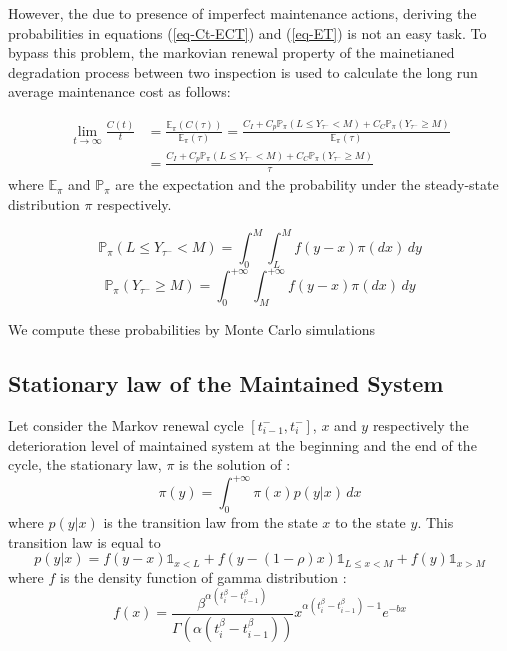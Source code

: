 \documentclass[review]{elsarticle}
\begin{document}
However, the due to presence of imperfect maintenance actions, deriving the probabilities in equations (\ref{eq-Ct-ECT}) and (\ref{eq-ET}) is not an easy task. To bypass this problem, the markovian renewal property of the mainetianed degradation process between two inspection is used to calculate the long run average maintenance cost as follows:

\begin{align}\label{eq-Ct-Epi}
\lim_{t\to\infty}\frac{C(t)}{t}&=\frac{{\mathds E}_{\pi}(C(\tau))}{{\mathds E}_{\pi}(\tau)}=\frac{ C_I +  C_p{\mathds P}_{\pi}(L \leq Y_{ \tau^-}< M) +C_C {\mathds P}_{\pi}( Y_{ \tau^-}\geq M)
}{{\mathds E}_{\pi}(\tau)}\nonumber\\
 & = \frac{ C_I +  C_p{\mathds P}_{\pi}(L \leq Y_{ \tau^-}< M) +C_C {\mathds P}_{\pi}( Y_{ \tau^-}\geq M)}{\tau}
\end{align}
where ${\mathds E}_{\pi}$ and ${\mathds P}_{\pi}$  are the expectation and the probability under the steady-state distribution $\pi$ respectively.

\begin{equation}\label{eq-Pi_1}
{\mathds P}_{\pi}(L \leq Y_{ \tau^-}< M)=\int_{0}^M \int_L^M f(y-x)\pi(dx)\,dy 
\end{equation}
\begin{equation}\label{eq-Pi_2}
{\mathds P}_{\pi}( Y_{ \tau^-}\geq M)=\int_{0}^{+\infty} \int_M^{+\infty} f(y-x)\pi(dx)\,dy 
\end{equation}

We compute these probabilities by Monte Carlo simulations







\subsection{Stationary law of the Maintained System}
Let consider the Markov renewal cycle $[t_{i-1}^-,t_i^-]$, $x$ and $y$ respectively the deterioration level of maintained system at the beginning and the end of the cycle, the stationary law, $\pi$ is the solution of :
\begin{equation}
    \pi(y) = \int_0^{+\infty} \pi(x) p(y|x)\,dx
\end{equation}
where $p(y|x)$ is the transition law from the state $x$ to the state $y$. This transition law is equal to
\begin{equation}
    p(y|x) = f(y-x){\mathds 1}_{x <L}  +f(y-(1-\rho)x){\mathds 1}_{L\leq x <M}  +f(y){\mathds 1}_{x >M} 
\end{equation}
where $f$ is the density function of gamma distribution :
$$
f(x) = \dfrac{\beta^{\alpha (t_i^\beta - t_{i-1}^\beta )}}{\Gamma(\alpha (t_i^\beta - t_{i-1}^\beta ))}x^{\alpha (t_i^\beta - t_{i-1}^\beta )-1}e^{-b x}
$$
\end{document}
